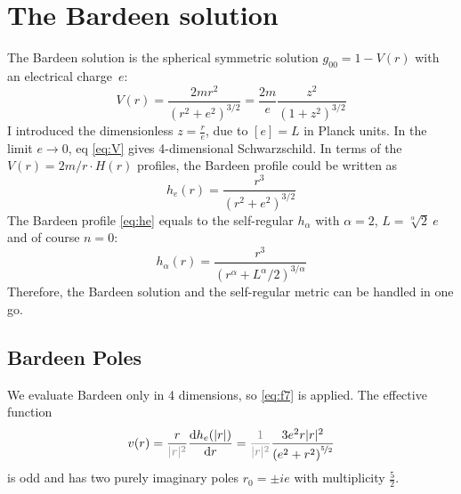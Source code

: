 \documentclass[10pt,a4paper, fleqn]{article}
\begin{document}
\section{The Bardeen solution}
The Bardeen solution is the spherical symmetric solution $g_{00} = 1 - V(r)$ with an electrical charge~$e$:
%
\begin{equation}
V(r) = \frac{2 m r^2}{(r^2 + e^2)^{3/2}} = \frac{2 m}e \frac{z^2}{(1 + z^2)^{3/2}}  \label{eq:V}
\end{equation}
%
I introduced the dimensionless $z= \frac re$, due to $[e]=L$ in Planck units. In the limit $e\to 0$, eq \eqref{eq:V} gives 4-dimensional Schwarzschild. In terms of the $V(r) = 2m/r \cdot H(r)$ profiles, the Bardeen profile could be written as
%
\begin{equation}
h_e(r) = \frac{r^3}{(r^2 + e^2)^{3/2}}  \label{eq:he}
\end{equation}
%
The Bardeen profile \eqref{eq:he} equals to the self-regular $h_\alpha$ with $\alpha=2$, $L = \sqrt[\alpha]2~e$ and of course $n=0$:
%
\begin{equation}
h_\alpha(r) = \frac{r^3}{(r^\alpha + L^\alpha / 2)^{3/\alpha}} \label{eq:halpha}
\end{equation}
%
Therefore, the Bardeen solution and the self-regular metric can be handled in one go.
%

\newpage
\subsection{Bardeen Poles}
We evaluate Bardeen only in 4 dimensions, so \eqref{eq:f7} is applied. The effective function
%
\begin{equation}
v(r) = \frac{r}{\mathcolor{gray}{|r|^2}} \dd{h_e(|r|)}{r} = 
\mathcolor{gray}{\frac 1{|r|^2}}
\frac{3 e^2 r |r|^2}{\left(e^2 + r^2\right)^{\nicefrac 52}}
\label{eq:bardeen-v}
\end{equation}
%
is odd and has two purely imaginary poles $r_0 = \pm i e$ with multiplicity $\frac{5}{2}$. %
\end{document}
